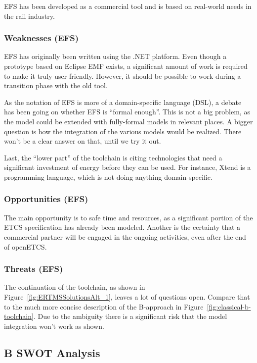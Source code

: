 EFS has been developed as a commercial tool and is based on real-world needs in the rail industry.

\subsubsection{Weaknesses (EFS)}

EFS has originally been written using the .NET platform.  Even though a prototype based on Eclipse EMF exists, a significant amount of work is required to make it truly user friendly.  However, it should be possible to work during a transition phase with the old tool.

As the notation of EFS is more of a domain-specific language (DSL), a debate has been going on whether EFS is ``formal enough''.  This is not a big problem, as the model could be extended with fully-formal models in relevant places.  A bigger question is how the integration of the various models would be realized.  There won't be a clear answer on that, until we try it out.

Last, the ``lower part'' of the toolchain is citing technologies that need a significant investment of energy before they can be used.  For instance, Xtend is a programming language, which is not doing anything domain-specific.

\subsubsection{Opportunities (EFS)}

The main opportunity is to safe time and resources, as a significant portion of the ETCS specification has already been modeled.  Another is the certainty that a commercial partner will be engaged in the ongoing activities, even after the end of openETCS.

\subsubsection{Threats (EFS)}

The continuation of the toolchain, as shown in Figure~\ref{fig:ERTMSSolutionsAlt_1}, leaves a lot of questions open.  Compare that to the much more concise description of the B-approach in Figure~\ref{fig:classical-b-toolchain}.  Due to the ambiguity there is a significant risk that the model integration won't work as shown.

\subsection{B SWOT Analysis}

